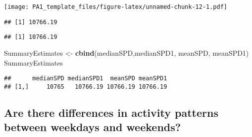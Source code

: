 \documentclass[
]{article}
\newenvironment{Shaded}{\begin{snugshade}}{\end{snugshade}}
\newcommand{\DataTypeTok}[1]{\textcolor[rgb]{0.13,0.29,0.53}{#1}}
\newcommand{\DecValTok}[1]{\textcolor[rgb]{0.00,0.00,0.81}{#1}}
\newcommand{\KeywordTok}[1]{\textcolor[rgb]{0.13,0.29,0.53}{\textbf{#1}}}
\newcommand{\NormalTok}[1]{#1}
\newcommand{\OperatorTok}[1]{\textcolor[rgb]{0.81,0.36,0.00}{\textbf{#1}}}
\newcommand{\StringTok}[1]{\textcolor[rgb]{0.31,0.60,0.02}{#1}}
\begin{document}
\begin{Shaded}
\end{Shaded}

\texttt{[image: PA1\_template\_files/figure-latex/unnamed-chunk-12-1.pdf]}

\begin{Shaded}
\end{Shaded}

\begin{verbatim}
## [1] 10766.19
\end{verbatim}

\begin{Shaded}
\end{Shaded}

\begin{verbatim}
## [1] 10766.19
\end{verbatim}

\begin{Shaded}
\begin{Highlighting}[]
\NormalTok{SummaryEstimates <-}\StringTok{ }\KeywordTok{cbind}\NormalTok{(medianSPD,medianSPD1, meanSPD, meanSPD1)}
\NormalTok{SummaryEstimates}
\end{Highlighting}
\end{Shaded}

\begin{verbatim}
##      medianSPD medianSPD1  meanSPD meanSPD1
## [1,]     10765   10766.19 10766.19 10766.19
\end{verbatim}

\hypertarget{are-there-differences-in-activity-patterns-between-weekdays-and-weekends}{%
\subsection{Are there differences in activity patterns between weekdays
and
weekends?}\label{are-there-differences-in-activity-patterns-between-weekdays-and-weekends}}
\end{document}
